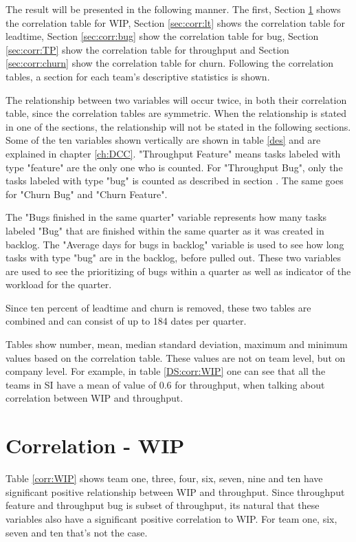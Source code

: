 \documentclass[UKenglish]{ifimaster}  %
\begin{document}
The result will be presented in the following manner. The first, Section \ref{sec:corr:WIP} shows the correlation table for WIP, Section \ref{sec:corr:lt} shows the correlation table for leadtime, Section \ref{sec:corr:bug} show the correlation table for bug, Section \ref {sec:corr:TP} show the correlation table for throughput and Section \ref {sec:corr:churn} show the correlation table for churn. Following the correlation tables, a section for each team's descriptive statistics  is shown.  


The relationship between two variables will occur twice, in both their correlation table, since the correlation tables are symmetric. When the relationship is stated in one of the sections, the relationship will not be stated in the following sections. Some of the ten variables shown vertically are shown in table \ref{des} and are explained in chapter \ref{ch:DCC}. "Throughput Feature" means tasks labeled with type "feature" are the only one who is counted. For "Throughput Bug", only the tasks labeled with type "bug" is counted as described in section . The same goes for "Churn Bug" and "Churn Feature". 

The "Bugs finished in the same quarter" variable represents how many tasks labeled "Bug" that are finished within the same quarter as it was created in backlog.  The "Average days for bugs in backlog" variable is used to see how long tasks with type "bug" are in the backlog, before pulled out. These two variables are used to see the prioritizing of bugs within a quarter as well as indicator of the workload for the quarter.   


Since ten percent of leadtime and churn is removed, these two tables are combined and can consist of up to 184 dates per quarter. 

Tables show number, mean, median standard deviation, maximum and minimum values based on the correlation table.  These values are not on team level, but on company level. For example, in table \ref{DS:corr:WIP} one can see that all the teams in SI have a mean of value of 0.6 for throughput, when talking about correlation between WIP and throughput. 

\section{Correlation - WIP}
\label{sec:corr:WIP}
Table \ref{corr:WIP} shows team one, three, four, six, seven, nine and ten have significant positive relationship between WIP and throughput. Since throughput feature and throughput bug is subset of throughput, its natural that these variables also have a significant positive correlation to WIP. For team one, six, seven and ten that's not the case. 
\end{document}

